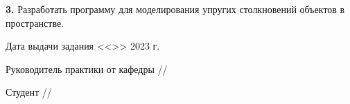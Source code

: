 \noindent \textbf{3.} Разработать программу для моделирования упругих столкновений объектов в пространстве.

\vfill

\noindent Дата выдачи задания <<>> 2023 г.

\vspace{1cm}



\noindent Руководитель практики от кафедры \hfill \ulinetext[2cm]{}{}//

\vspace{0.3cm}

\noindent Студент \hfill \ulinetext[2cm]{}{}//

\vfill

